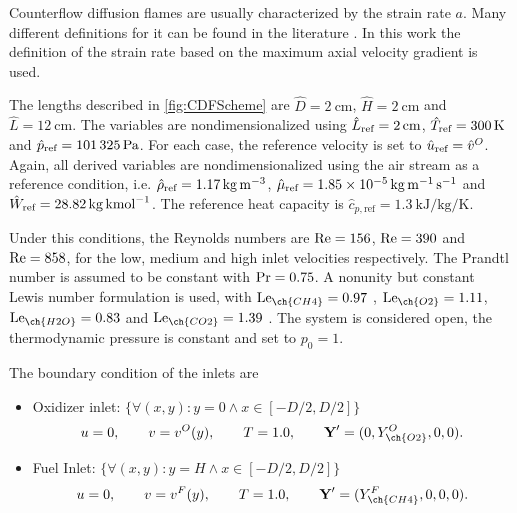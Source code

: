 Counterflow diffusion flames are usually characterized by the strain rate $a$. Many different definitions for it can be found in the literature \parencite{fialaNonpremixedCounterflowFlames2014}. In this work the definition of the strain rate based on the maximum axial velocity gradient is used. %


The lengths described in \cref{fig:CDFScheme} are $\hat D = \SI{2}{\centi\meter}$, $\hat H = \SI{2}{\centi\meter}$ and $\hat L = \SI{12}{\centi\meter}$. The variables are nondimensionalized using $\hat L_{\text{ref}} = \SI{2}{\centi\meter}$, $\hat T_{\text{ref}} = \SI{300}{\kelvin}$ and $\hat p_{\text{ref}} = \SI{101325}{\pascal}$.  For each case, the reference velocity is set to $\hat u_{\text{ref}} = \hat v^O$.  Again, all derived variables are nondimensionalized using the air stream as a reference condition, i.e. $\hat \rho_{\text{ref}} = \SI{1.17}{\kilo \gram \per \cubic \meter}$, $\hat \mu_{\text{ref}} = \SI{1.85e-5}{\kilo \gram \per \meter \per \second}$ and $\hat W_{\text{ref}} = \SI{28.82}{\kilo \gram \per \kilo\mole}$. The reference heat capacity is $\hat{c}_{p,\text{ref}}= \SI{1.3}{\kilo \joule \per \kilo \gram \per \kelvin}$. 

Under this conditions, the Reynolds numbers are $\text{Re} = 156$, $\text{Re} = 390$ and $\text{Re} = 858$, for the low, medium and high inlet velocities respectively. The Prandtl number is assumed to be constant with $\text{Pr} = 0.75$. A nonunity but constant Lewis number formulation is used, with $\Lewis_{\ch{CH4}} =  0.97 $ , $\Lewis_{\ch{O2}} = 1.11 $, $\Lewis_{\ch{H2O}} = 0.83 $ and $\Lewis_{\ch{CO2}} = 1.39 $ \parencite{smookePremixedNonpremixedTest1991}. The system is considered open, the thermodynamic pressure is constant and set to $ p_0 = 1$. %


The boundary condition of the inlets are
\begin{itemize}
	\item Oxidizer inlet: $\{\forall (x,y): y = 0 \land x \in [-D/2, D/2]\}$\\
	\begin{equation*}
		u = 0,\qquad v= v^O(y), \qquad T = 1.0, \qquad \vec{Y}' = (0,Y^O_{\ch{O2}},0,0).
	\end{equation*}
	\item Fuel Inlet: $\{\forall (x,y): y = H \land x \in [-D/2, D/2]\} $ \\
	\begin{equation*}
		u = 0,\qquad v= v^F(y), \qquad T = 1.0, \qquad \vec{Y}' = (Y^F_{\ch{CH4}},0,0,0).
	\end{equation*}
\end{itemize}
 
